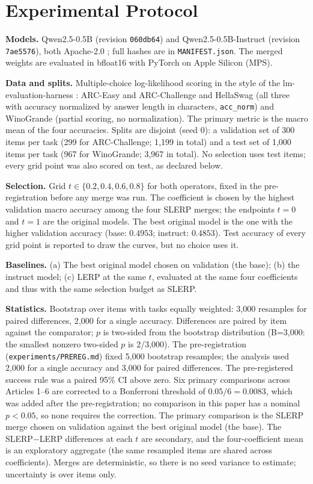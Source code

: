 \documentclass[conference]{IEEEtran}
\begin{document}
\section{Experimental Protocol}
\textbf{Models.} Qwen2.5-0.5B (revision \texttt{060db64}) and Qwen2.5-0.5B-Instruct (revision \texttt{7ae5576}), both Apache-2.0 \cite{qwen25}; full hashes are in \texttt{MANIFEST.json}. The merged weights are evaluated in bfloat16 with PyTorch on Apple Silicon (MPS).

\textbf{Data and splits.} Multiple-choice log-likelihood scoring in the style of the lm-evaluation-harness \cite{gao2021harness}: ARC-Easy and ARC-Challenge \cite{clark2018arc} and HellaSwag \cite{zellers2019hellaswag} (all three with accuracy normalized by answer length in characters, \texttt{acc\_norm}) and WinoGrande \cite{sakaguchi2019winogrande} (partial scoring, no normalization). The primary metric is the macro mean of the four accuracies. Splits are disjoint (seed 0): a validation set of 300 items per task (299 for ARC-Challenge; 1{,}199 in total) and a test set of 1{,}000 items per task (967 for WinoGrande; 3{,}967 in total). No selection uses test items; every grid point was also scored on test, as declared below.

\textbf{Selection.} Grid $t\in\{0.2,0.4,0.6,0.8\}$ for both operators, fixed in the pre-registration before any merge was run. The coefficient is chosen by the highest validation macro accuracy among the four SLERP merges; the endpoints $t=0$ and $t=1$ are the original models. The best original model is the one with the higher validation accuracy (base: $0.4953$; instruct: $0.4853$). Test accuracy of every grid point is reported to draw the curves, but no choice uses it.

\textbf{Baselines.} (a) The best original model chosen on validation (the base); (b) the instruct model; (c) LERP at the same $t$, evaluated at the same four coefficients and thus with the same selection budget as SLERP.

\textbf{Statistics.} Bootstrap over items with tasks equally weighted: 3{,}000 resamples for paired differences, 2{,}000 for a single accuracy. Differences are paired by item against the comparator; $p$ is two-sided from the bootstrap distribution (B=3,000: the smallest nonzero two-sided $p$ is 2/3,000). The pre-registration (\texttt{experiments/PREREG.md}) fixed 5,000 bootstrap resamples; the analysis used 2,000 for a single accuracy and 3,000 for paired differences. The pre-registered success rule was a paired 95\% CI above zero. Six primary comparisons across Articles 1--6 are corrected to a Bonferroni threshold of $0.05/6=0.0083$, which was added after the pre-registration; no comparison in this paper has a nominal $p<0.05$, so none requires the correction. The primary comparison is the SLERP merge chosen on validation against the best original model (the base). The SLERP$-$LERP differences at each $t$ are secondary, and the four-coefficient mean is an exploratory aggregate (the same resampled items are shared across coefficients). Merges are deterministic, so there is no seed variance to estimate; uncertainty is over items only.
\end{document}
